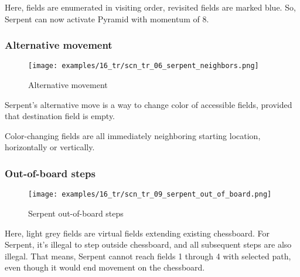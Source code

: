 Here, fields are enumerated in visiting order, revisited fields are marked
blue. So, Serpent can now activate Pyramid with momentum of 8.

\clearpage %

\subsubsection*{Alternative movement}

\noindent
\begin{wrapfigure}[7]{l}{0.4\textwidth}
\centering
\texttt{[image: examples/16\_tr/scn\_tr\_06\_serpent\_neighbors.png]}
\caption{Alternative movement}
\label{fig:scn_tr_06_serpent_neighbors}
\end{wrapfigure}
Serpent's alternative move is a way to change color of accessible fields,
provided that destination field is empty.

Color-changing fields are all immediately neighboring starting location,
horizontally or vertically.

\clearpage %

\subsubsection*{Out-of-board steps}

\vspace*{-1.0\baselineskip}
\noindent
\begin{figure}[!h]
\texttt{[image: examples/16\_tr/scn\_tr\_09\_serpent\_out\_of\_board.png]}
\caption{Serpent out-of-board steps}
\label{fig:scn_tr_09_serpent_out_of_board}
\end{figure}

Here, light grey fields are virtual fields extending existing chessboard.
For Serpent, it's illegal to step outside chessboard, and all subsequent
steps are also illegal. That means, Serpent cannot reach fields 1 through
4 with selected path, even though it would end movement on the chessboard.

\clearpage %

